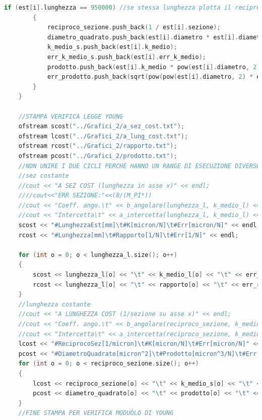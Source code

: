 \documentclass[a4paper,11pt,oneside]{article}
\begin{document}
\begin{lstlisting}[language=C++, label=lst:seconda_parte, caption=seconda\_parte]
		if (est[i].lunghezza == 950000) //se stessa lunghezza plotta il reciproco della sezione
		{
			reciproco_sezione.push_back(1 / est[i].sezione);
			diametro_quadrato.push_back(est[i].diametro * est[i].diametro); //diametro quadrato in micron
			k_medio_s.push_back(est[i].k_medio);
			err_k_medio_s.push_back(est[i].err_k_medio);
			prodotto.push_back(est[i].k_medio * pow(est[i].diametro, 2));
			err_prodotto.push_back(sqrt(pow(pow(est[i].diametro, 2) * est[i].err_k_medio, 2) + (pow((2 * est[i].k_medio * est[i].diametro), 2) * pow(est[i].err_diametro, 2))));
		}
	}

	//STAMPA VERIFICA LEGGE YOUNG
	ofstream scost("../Grafici_2/a_sez_cost.txt");
	ofstream lcost("../Grafici_2/a_lung_cost.txt");
	ofstream rcost("../Grafici_2/rapporto.txt");
	ofstream pcost("../Grafici_2/prodotto.txt");
	//NON UNIRE I DUE CICLI PERCHÈ HANNO UN RANGE DI ESECUZIONE DIVERSO A SECONDA DEL NUMERO DI EST CHE RICADONO NELLA CASISTICA
	//sez costante
	//cout << "A SEZ COST (lunghezza in asse x)" << endl;
	////cout<<"ERR SEZIONE:"<<(8/(M_PI*))
	//cout << "Coeff. ango.\t" << b_angolare(lunghezza_l, k_medio_l) << " +/- " << sigma_b_y_uguali(lunghezza_l, err_k_medio_l[0]) << endl;
	//cout << "Intercetta\t" << a_intercetta(lunghezza_l, k_medio_l) << " +/- " << sigma_a_y_uguali(lunghezza_l, err_k_medio_l[0]) << endl;
	scost << "#LunghezzaEst[mm]\t#K[micron/N]\t#Err[micron/N]" << endl;
	rcost << "#Lunghezza[mm]\t#Rapporto[1/N]\t#Err[1/N]" << endl;

	for (int o = 0; o < lunghezza_l.size(); o++)
	{
		scost << lunghezza_l[o] << "\t" << k_medio_l[o] << "\t" << err_k_medio_l[o] << endl;
		rcost << lunghezza_l[o] << "\t" << rapporto[o] << "\t" << err_rapporto[o] << endl;
	}
	//lunghezza costante
	//cout << "A LUNGHEZZA COST (1/sezione su asse x)" << endl;
	//cout << "Coeff. ango.\t" << b_angolare(reciproco_sezione, k_medio_s) << " +/- " << sigma_b_y_uguali(reciproco_sezione, err_k_medio_l[0]) << endl;
	//cout << "Intercetta\t" << a_intercetta(reciproco_sezione, k_medio_s) << " +/- " << sigma_a_y_uguali(reciproco_sezione, err_k_medio_l[0]) << endl;
	lcost << "#ReciprocoSez[1/micron]\t#K[micron/N]\t#Err[micron/N]" << endl;
	pcost << "#DiametroQuadrato[micron^2]\t#Prodotto[micron^3/N]\t#Err[micron^3/N]" << endl;
	for (int o = 0; o < reciproco_sezione.size(); o++)
	{
		lcost << reciproco_sezione[o] << "\t" << k_medio_s[o] << "\t" << err_k_medio_s[o] << "\t" << endl;
		pcost << diametro_quadrato[o] << "\t" << prodotto[o] << "\t" << err_prodotto[o] << endl;
	}
	//FINE STAMPA PER VERIFICA MODUÒLO DI YOUNG


\end{lstlisting}
\end{document}
